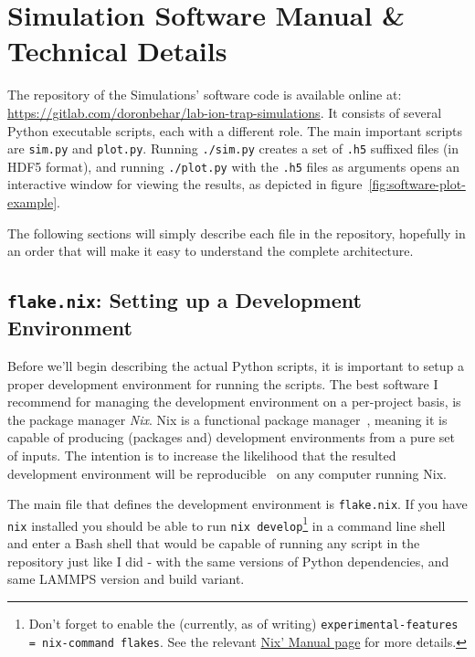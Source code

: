 \chapter{Simulation Software Manual \& Technical Details}\label{chap:software}

The repository of the Simulations' software code is available online at: \url{https://gitlab.com/doronbehar/lab-ion-trap-simulations}. It consists of several Python executable scripts, each with a different role. The main important scripts are \texttt{sim.py} and \texttt{plot.py}. Running \texttt{./sim.py} creates a set of \texttt{.h5} suffixed files (in HDF5\cite{HDF5} format), and running \texttt{./plot.py} with the \texttt{.h5} files as arguments opens an interactive window for viewing the results, as depicted in figure~\ref{fig:software-plot-example}.

The following sections will simply describe each file in the repository, hopefully in an order that will make it easy to understand the complete architecture.

\section{\texttt{flake.nix}: Setting up a Development Environment}

Before we'll begin describing the actual Python scripts, it is important to setup a proper development environment for running the scripts. The best software I recommend for managing the development environment on a per-project basis, is the package manager \textit{Nix}\cite{Nix}. Nix is a functional package manager~\cite{NixThesis}, meaning it is capable of producing (packages and) development environments from a pure set of inputs. The intention is to increase the likelihood that the resulted development environment will be reproducible~\cite{SoftwareReproducitilityThesis} on any computer running Nix.

The main file that defines the development environment is \texttt{flake.nix}. If you have \texttt{nix} installed you should be able to run \texttt{nix develop}\footnote{Don't forget to enable the (currently, as of writing) \texttt{experimental-features = nix-command flakes}. See the relevant \href{https://nix.dev/manual/nix/stable/contributing/experimental-features}{Nix' Manual page} for more details.} in a command line shell and enter a Bash shell that would be capable of running any script in the repository just like I did - with the same versions of Python dependencies, and same LAMMPS version and build variant.

